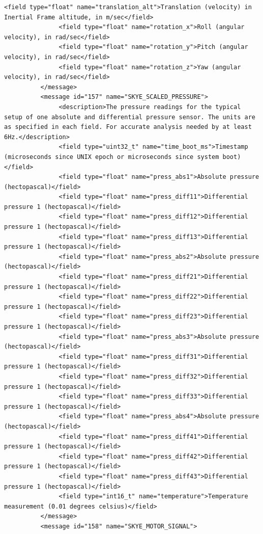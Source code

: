 \begin{lstlisting}[captionpos=b, caption="Definition of \textsc{Skye} specific Mavlink messages", label=app_xml]
               <field type="float" name="translation_alt">Translation (velocity) in Inertial Frame altitude, in m/sec</field>
               <field type="float" name="rotation_x">Roll (angular velocity), in rad/sec</field>
               <field type="float" name="rotation_y">Pitch (angular velocity), in rad/sec</field>
               <field type="float" name="rotation_z">Yaw (angular velocity), in rad/sec</field>
          </message>
          <message id="157" name="SKYE_SCALED_PRESSURE">
               <description>The pressure readings for the typical setup of one absolute and differential pressure sensor. The units are as specified in each field. For accurate analysis needed by at least 6Hz.</description>
               <field type="uint32_t" name="time_boot_ms">Timestamp (microseconds since UNIX epoch or microseconds since system boot)</field>
               <field type="float" name="press_abs1">Absolute pressure (hectopascal)</field>
               <field type="float" name="press_diff11">Differential pressure 1 (hectopascal)</field>
               <field type="float" name="press_diff12">Differential pressure 1 (hectopascal)</field>
               <field type="float" name="press_diff13">Differential pressure 1 (hectopascal)</field>
               <field type="float" name="press_abs2">Absolute pressure (hectopascal)</field>
               <field type="float" name="press_diff21">Differential pressure 1 (hectopascal)</field>
               <field type="float" name="press_diff22">Differential pressure 1 (hectopascal)</field>
               <field type="float" name="press_diff23">Differential pressure 1 (hectopascal)</field>
               <field type="float" name="press_abs3">Absolute pressure (hectopascal)</field>
               <field type="float" name="press_diff31">Differential pressure 1 (hectopascal)</field>
               <field type="float" name="press_diff32">Differential pressure 1 (hectopascal)</field>
               <field type="float" name="press_diff33">Differential pressure 1 (hectopascal)</field>
               <field type="float" name="press_abs4">Absolute pressure (hectopascal)</field>
               <field type="float" name="press_diff41">Differential pressure 1 (hectopascal)</field>
               <field type="float" name="press_diff42">Differential pressure 1 (hectopascal)</field>
               <field type="float" name="press_diff43">Differential pressure 1 (hectopascal)</field>
               <field type="int16_t" name="temperature">Temperature measurement (0.01 degrees celsius)</field>
          </message>
          <message id="158" name="SKYE_MOTOR_SIGNAL">

\end{lstlisting}
